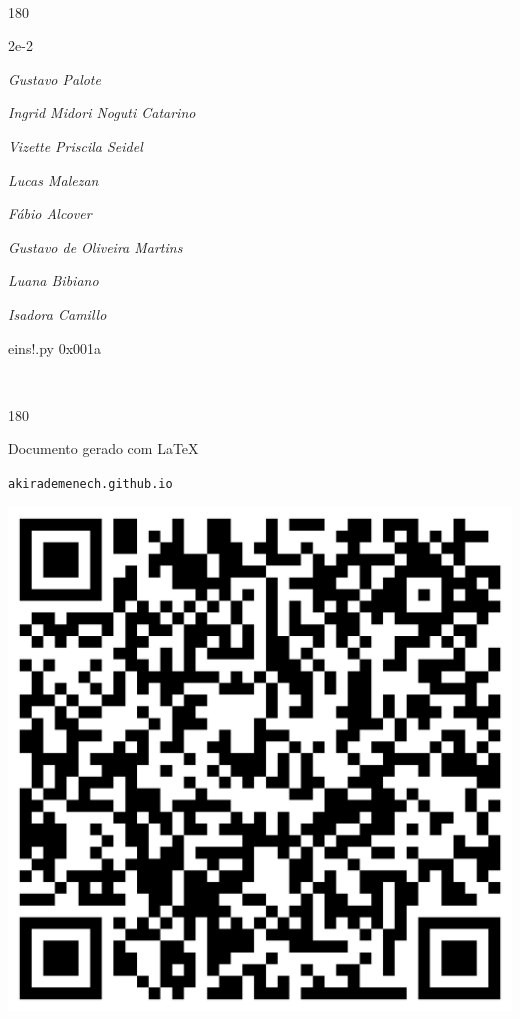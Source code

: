 \documentclass[12pt]{article}
\begin{document}
	\ 
	\vfill
	\begin{turn}{180}	
		\begin{minipage}{\textwidth}
		  	\ttfamily %
			\centering
			{\Huge 2e-2}
		  
			\hfill
		  
			

\textit{\small Gustavo Palote}

\textit{\small Ingrid Midori Noguti Catarino}

\textit{\small Vizette Priscila Seidel}

\textit{\small Lucas Malezan}

\textit{\small Fábio Alcover}

\textit{\small Gustavo de Oliveira Martins}

\textit{\small Luana Bibiano}

\textit{\small Isadora Camillo}

\bigskip

eins!.py
0x001a


		\end{minipage}	
	\end{turn}
	\vfill
	\

\pagebreak

	\begin{turn}{180}	
		\begin{minipage}{\textwidth}		  
		  Documento gerado com \LaTeX			
		  
		  \texttt{akirademenech.github.io}

		  \includegraphics[height=0.3\textheight]{2e-2.pdf}

		\end{minipage}	
	\end{turn}  
		  
\end{document}
